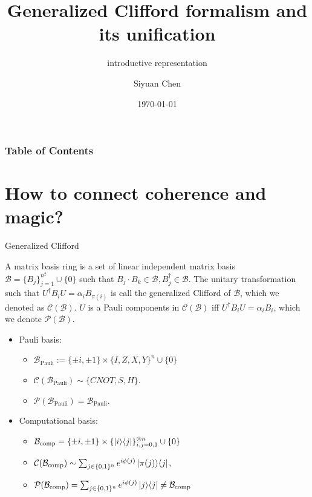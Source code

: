 \documentclass{beamer}
\title[Rep0412]
{Generalized Clifford formalism and its unification}
\subtitle{introductive representation}
\author[Siyuan Chen] %
{Siyuan Chen\inst{1}}
\date[Representation] %
{\today}
\begin{document}
\frame{\titlepage}

\begin{frame}
\frametitle{Table of Contents}
\tableofcontents
\end{frame}



\section{How to connect coherence and magic?}
\begin{frame}{Generalized Clifford}
\begin{definition}
    A matrix basis ring is a set of linear independent matrix basis $\mathcal{B}=\{{B}_j\}_{j = 1}^{n^2} \cup \{0\}$ such that ${B}_j \cdot{B}_k \in \mathcal{B}, B_j^\dagger \in \mathcal{B}$. The unitary transformation such that  $U^\dagger B_iU = \alpha_i B_{\pi (i)}$ is call the generalized Clifford of $\mathcal{B}$, which we denoted as $\mathcal{C}(\mathcal{B})$. $U$ is a Pauli components in $\mathcal{C}(\mathcal{B})$ iff $U^\dagger B_iU = \alpha_i B_i$, which we denote $\mathcal{P}(\mathcal{B})$. 
\end{definition}
\begin{itemize}
    \item Pauli basis:
    \begin{itemize}
        \item $\mathcal{B}_{\text{Pauli}}:=\{\pm i,\pm1\} \times \{I,Z,X,Y\}^n \cup \{0\}$
        \item $\mathcal{C}(\mathcal{B}_{\text{Pauli}}) \sim \{CNOT,S,H\} $. 
        \item  $\mathcal{P}(\mathcal{B}_{\text{Pauli}})  =\mathcal{B}_{\text{Pauli}} $.
    \end{itemize}
    \item Computational basis:
    \begin{itemize}
        \item  $\mathcal{B}_{\text{comp}} = \{\pm i, \pm 1\} \times \{\ket{i}\!\bra{j}\}_{i,j = 0,1}^{\otimes n}\cup \{0\}$
        \item $\mathcal{C}(\mathcal{B}_{\text{comp}})\sim \sum_{j \in \{0,1\}^n}e^{i\phi(j) } \ket{\pi(j)}\!\bra{j}$,
        \item   $\mathcal{P}(\mathcal{B}_{\text{comp}}) = \sum_{j \in \{0,1\}^n}e^{i\phi(j) } \ket{j}\!\bra{j}  \neq \mathcal{B}_{\text{comp}} $ 
    \end{itemize}
\end{itemize}

\end{frame}
\end{document}
